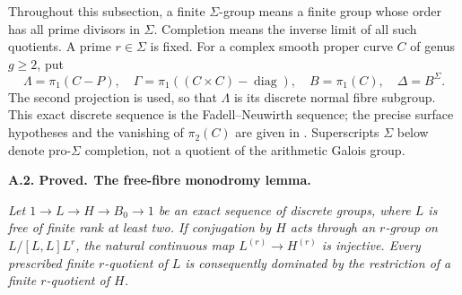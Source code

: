 \documentclass[11pt,a4paper]{article}
\newenvironment{claim}[3]{\par\medskip\noindent\hypertarget{#1}{\textbf{#1. #2.}}\ \textbf{#3.}\par\nopagebreak\smallskip\begingroup\itshape}{\endgroup\par\smallskip}
\begin{document}
Throughout this subsection, a finite $\Sigma$-group means a finite group
whose order has all prime divisors in $\Sigma$. Completion means the
inverse limit of all such quotients. A prime $r\in\Sigma$ is fixed.
For a complex smooth proper curve $C$ of genus $g\geq2$, put
\[
 \Lambda=\pi_1(C-P),\quad \Gamma=\pi_1((C\times C)-\operatorname{diag}),
 \quad B=\pi_1(C),\quad \Delta=B^{\Sigma}.
\]
The second projection is used, so that $\Lambda$ is its discrete normal
fibre subgroup. This exact discrete sequence is the
Fadell--Neuwirth sequence; the precise surface hypotheses and the
vanishing of $\pi_2(C)$ are given in
\citet[Section 2.1]{Bellingeri2004}. Superscripts $\Sigma$ below denote
pro-$\Sigma$ completion, not a quotient of the arithmetic Galois group.

\begin{claim}{A.2}{Proved}{The free-fibre monodromy lemma}
Let $1\to L\to H\to B_0\to1$ be an exact sequence of discrete groups,
where $L$ is free of finite rank at least two. If conjugation by $H$
acts through an $r$-group on $L/[L,L]L^r$, the natural continuous map
$L^{(r)}\to H^{(r)}$ is injective. Every prescribed finite $r$-quotient
of $L$ is consequently dominated by the restriction of a finite
$r$-quotient of $H$.
\end{claim}
\end{document}
